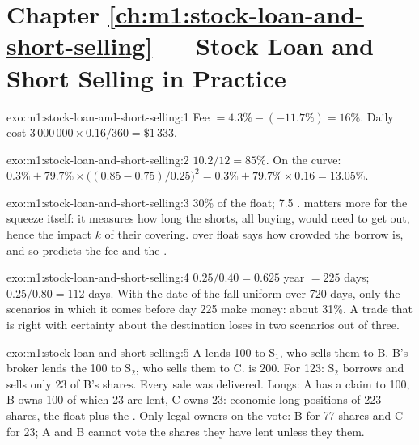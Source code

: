 \section*{Chapter \ref{ch:m1:stock-loan-and-short-selling} --- Stock Loan and Short Selling in Practice}

\begin{solution}{exo:m1:stock-loan-and-short-selling:1}
Fee $= 4.3\% - (-11.7\%) = 16\%$. Daily cost $3\,000\,000 \times 0.16/360 =
\$1\,333$.
\end{solution}

\begin{solution}{exo:m1:stock-loan-and-short-selling:2}
 $10.2/12 = 85\%$. On the curve: $0.3\% + 79.7\% \times
\bigl((0.85-0.75)/0.25\bigr)^2 = 0.3\% + 79.7\% \times 0.16 = 13.05\%$.
\end{solution}

\begin{solution}{exo:m1:stock-loan-and-short-selling:3}
30\% of the float; 7.5 .  matters more for the
squeeze itself: it measures how long the shorts, all buying, would need to
get out, hence the impact $k$ of their covering.  over float
says how crowded the borrow is, and so predicts the fee and the .
\end{solution}

\begin{solution}{exo:m1:stock-loan-and-short-selling:4}
$0.25/0.40 = 0.625$ year $= 225$ days; $0.25/0.80 = 112$ days. With the date
of the fall uniform over 720 days, only the scenarios in which it comes
before day 225 make money: about 31\%. A trade that is right with certainty
about the destination loses in two scenarios out of three.
\end{solution}

\begin{solution}{exo:m1:stock-loan-and-short-selling:5}
A lends 100 to S$_1$, who sells them to B. B's broker lends the 100 to
S$_2$, who sells them to C.  is 200. For 123: S$_2$ borrows and
sells only 23 of B's shares. Every sale was delivered. Longs: A has a claim
to 100, B owns 100 of which 23 are lent, C owns 23: economic long positions
of 223 shares, the float plus the . Only legal owners on the
 vote: B for 77 shares and C for 23; A and B cannot vote the
shares they have lent unless they  them.
\end{solution}

